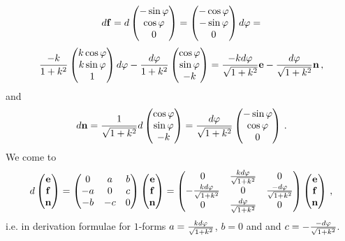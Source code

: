 \documentclass[12pt]{article}
\theoremstyle{theorem}
\numberwithin{equation}{section}
\begin{document}
           $$
   d{\bf f}=d\begin{pmatrix}
        -\sin\varphi\cr
        \cos\varphi\cr
          0\cr
   \end{pmatrix}=
     \begin{pmatrix}
        -\cos\varphi\cr
        -\sin\varphi\cr
          0\cr
   \end{pmatrix}d\varphi=
        $$
        $$
   {-k\over 1+k^2}\begin{pmatrix}
        k\cos\varphi\cr
        k\sin\varphi\cr
        1\cr
   \end{pmatrix}d\varphi-{d\varphi\over 1+k^2}
             \begin{pmatrix}
        \cos \varphi\cr
        \sin\varphi\cr
        -k\cr
   \end{pmatrix}={-kd\varphi\over \sqrt{1+k^2}}{\bf e}-{d\varphi\over \sqrt {1+k^2}}{\bf n}\,,
     $$
and
       $$
   d{\bf n}={1\over \sqrt {1+k^2}}d\begin{pmatrix}
        \cos \varphi\cr
        \sin\varphi\cr
        -k\cr
   \end{pmatrix}=
   {d\varphi\over \sqrt {1+k^2}}
   \begin{pmatrix}
        -\sin \varphi\cr
        \cos\varphi\cr
        0\cr
   \end{pmatrix}\,.
       $$
We come to
   \begin{equation}\label{derivationformulaefor cone}
                    d\begin{pmatrix}
                    {\bf e}\cr{\bf f}\cr{\bf n}\cr
                    \end{pmatrix}=
                    \begin{pmatrix}
                    0&a&b\cr -a&0&c\cr -b&-c&0\cr
                    \end{pmatrix}
                 \begin{pmatrix}
                    {\bf e}\cr{\bf f}\cr{\bf n}\cr
                    \end{pmatrix}=
                     \begin{pmatrix}
                    0&{kd\varphi\over \sqrt {1+k^2}}&0\cr
                     -{kd\varphi\over \sqrt {1+k^2}}&0&{-d\varphi\over \sqrt {1+k^2}}\cr
                      0&{d\varphi\over \sqrt {1+k^2}}&0\cr
                    \end{pmatrix}
                 \begin{pmatrix}
                    {\bf e}\cr{\bf f}\cr{\bf n}\cr
                    \end{pmatrix}\,,
                   \end{equation}
  i.e. in derivation formulae for $1$-forms $a={kd\varphi\over \sqrt {1+k^2}}$, $b=0$ and
  and $c=-{-d\varphi\over \sqrt {1+k^2}}$.
\end{document}
